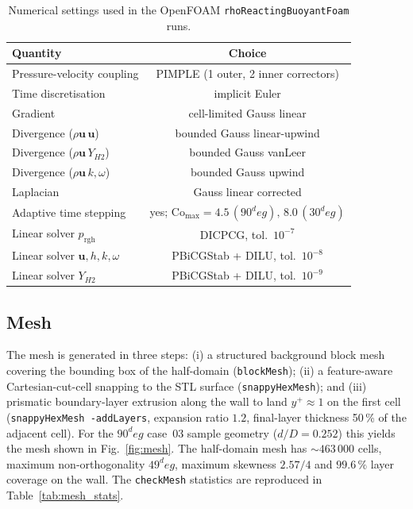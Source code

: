 \documentclass[11pt,a4paper]{article}
\def\Hi{H2}%
\def\dD{d/D}%
\def\circ{ deg}%
\newcommand{\Hi}{\ensuremath{\mathrm{H_2}}}
\newcommand{\dD}{\ensuremath{d/D}}
\begin{document}
\begin{table}[H]
\centering
\small
\caption{Numerical settings used in the OpenFOAM
\texttt{rhoReactingBuoyantFoam} runs.}
\label{tab:numerics}
\begin{tabular}{lc}
\toprule
\textbf{Quantity} & \textbf{Choice} \\
\midrule
Pressure-velocity coupling & PIMPLE (1 outer, 2 inner correctors) \\
Time discretisation & implicit Euler \\
Gradient & cell-limited Gauss linear \\
Divergence (\(\rho\mathbf{u}\,\mathbf{u}\)) & bounded Gauss linear-upwind \\
Divergence (\(\rho\mathbf{u}\,Y_{\Hi}\)) & bounded Gauss vanLeer \\
Divergence (\(\rho\mathbf{u}\,k,\omega\)) & bounded Gauss upwind \\
Laplacian & Gauss linear corrected \\
Adaptive time stepping & yes; \(\mathrm{Co}_{\max}=4.5\,(90^\circ),\,8.0\,(30^\circ)\) \\
Linear solver \(p_{\mathrm{rgh}}\) & DICPCG, tol.\ \(10^{-7}\) \\
Linear solver \(\mathbf{u},h,k,\omega\) & PBiCGStab + DILU, tol.\ \(10^{-8}\) \\
Linear solver \(Y_{\Hi}\) & PBiCGStab + DILU, tol.\ \(10^{-9}\) \\
\bottomrule
\end{tabular}
\end{table}

\subsection{Mesh}
\label{sec:method_mesh}
The mesh is generated in three steps: (i) a structured background
block mesh covering the bounding box of the half-domain
(\texttt{blockMesh}); (ii) a feature-aware Cartesian-cut-cell
snapping to the STL surface (\texttt{snappyHexMesh}); and
(iii) prismatic boundary-layer extrusion along the wall to land
\(y^+\approx 1\) on the first cell (\texttt{snappyHexMesh -addLayers},
expansion ratio \(1.2\), final-layer thickness 50\,\% of the
adjacent cell). For the \(90^\circ\) case~03 sample geometry
(\(\dD = 0.252\)) this yields the mesh shown in
Fig.~\ref{fig:mesh}. The half-domain mesh has \(\sim 463\,000\)
cells, maximum non-orthogonality \(49^\circ\), maximum skewness
\(2.57/4\) and \(99.6\,\%\) layer coverage on the wall. The
\texttt{checkMesh} statistics are reproduced in
Table~\ref{tab:mesh_stats}.
\end{document}
